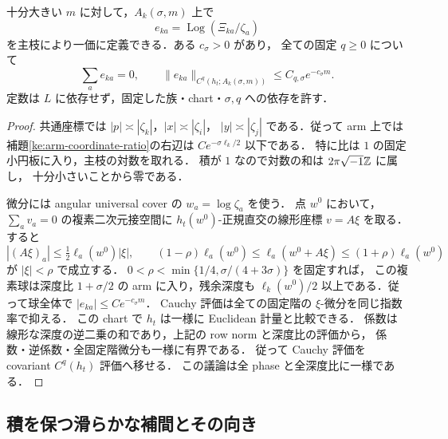 \begin{proposition}[比の対数の一様な指数的小摂動]
\label{ke:arm-log-derivatives}
十分大きい $m$ に対して，$A_k(\sigma,m)$ 上で
\[
 e_{ka}=\operatorname{Log}(\Xi_{ka}/\zeta_a)
\]
を主枝により一価に定義できる．ある $c_\sigma>0$ があり，
全ての固定 $q\ge0$ について
\begin{equation}\label{ke:eq:arm-log-derivatives}
 \sum_a e_{ka}=0,\qquad
 \|e_{ka}\|_{C^q(h_t;A_k(\sigma,m))}
 \le C_{q,\sigma}e^{-c_\sigma m}.
\end{equation}
定数は $L$ に依存せず，固定した族・chart・$\sigma,q$ への依存を許す．
\end{proposition}
\begin{proof}
共通座標では $|p|\asymp|\zeta_k|$，$|x|\asymp|\zeta_i|$，
$|y|\asymp|\zeta_j|$ である．従って arm 上では
補題\ref{ke:arm-coordinate-ratio}の右辺は $Ce^{-\sigma\ell_k/2}$ 以下である．
特に比は $1$ の固定小円板に入り，主枝の対数を取れる．
積が $1$ なので対数の和は $2\pi\sqrt{-1}\mathbb Z$ に属し，
十分小さいことから零である．

微分には angular universal cover の $w_a=\log\zeta_a$ を使う．
点 $w^0$ において，$\sum_a v_a=0$ の複素二次元接空間に
$h_t(w^0)$-正規直交の線形座標 $v=A\xi$ を取る．すると
\[
 |(A\xi)_a|\le\tfrac12\ell_a(w^0)|\xi|,
 \qquad
 (1-\rho)\ell_a(w^0)\le\ell_a(w^0+A\xi)
                  \le(1+\rho)\ell_a(w^0)
\]
が $|\xi|<\rho$ で成立する．
$0<\rho<\min\{1/4,\sigma/(4+3\sigma)\}$ を固定すれば，
この複素球は深度比 $1+\sigma/2$ の arm に入り，残余深度も
$\ell_k(w^0)/2$ 以上である．従って球全体で $|e_{ka}|\le Ce^{-c_\sigma m}$．
Cauchy 評価は全ての固定階の $\xi$-微分を同じ指数率で抑える．
この chart で $h_t$ は一様に Euclidean 計量と比較できる．
係数は線形な深度の逆二乗の和であり，上記の row norm と深度比の評価から，
係数・逆係数・全固定階微分も一様に有界である．
従って Cauchy 評価を covariant $C^q(h_t)$ 評価へ移せる．
この議論は全 phase と全深度比に一様である．
\end{proof}

\subsection{積を保つ滑らかな補間とその向き}

